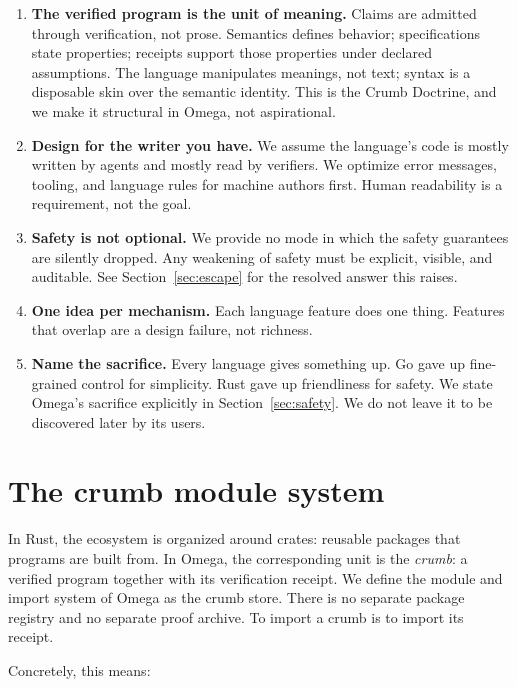 \documentclass[11pt]{article}
\begin{document}
\begin{enumerate}
\item \textbf{The verified program is the unit of meaning.} Claims are
admitted through verification, not prose. Semantics defines behavior;
specifications state properties; receipts support those properties under
declared assumptions. The language manipulates meanings, not text;
syntax is a disposable skin over the semantic identity. This is the
Crumb Doctrine, and we make it structural in Omega, not aspirational.

\item \textbf{Design for the writer you have.} We assume the language's code
is mostly written by agents and mostly read by verifiers. We optimize
error messages, tooling, and language rules for machine authors first.
Human readability is a requirement, not the goal.

\item \textbf{Safety is not optional.} We provide no mode in which the safety
guarantees are silently dropped. Any weakening of safety must be explicit,
visible, and auditable. See Section~\ref{sec:escape} for the resolved
answer this raises.

\item \textbf{One idea per mechanism.} Each language feature does one thing.
Features that overlap are a design failure, not richness.

\item \textbf{Name the sacrifice.} Every language gives something up. Go
gave up fine-grained control for simplicity. Rust gave up friendliness for
safety. We state Omega's sacrifice explicitly in
Section~\ref{sec:safety}. We do not leave it to be discovered later by
its users.
\end{enumerate}

\section{The crumb module system}

In Rust, the ecosystem is organized around crates: reusable packages that
programs are built from. In Omega, the corresponding unit is the
\emph{crumb}: a verified program together with its verification receipt. We
define the module and import system of Omega as the crumb store. There is
no separate package registry and no separate proof archive. To import a
crumb is to import its receipt.

Concretely, this means:
\end{document}
